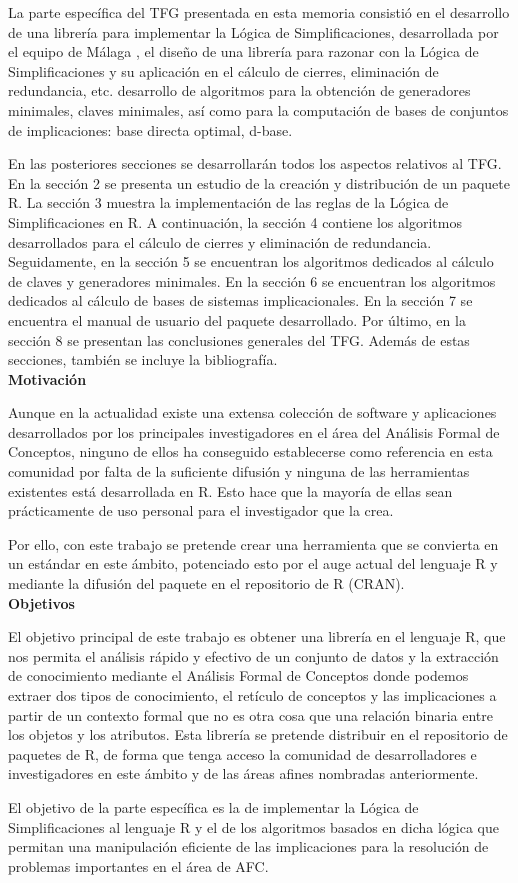 La parte espec\'ifica del TFG presentada en esta memoria consisti\'o en el desarrollo de una librer\'ia para implementar la L\'ogica de Simplificaciones, desarrollada por el equipo de M\'alaga \cite{Cordero2002}, el dise\~no de una librer\'ia para razonar con la L\'ogica de Simplificaciones y su aplicaci\'on en el c\'alculo de cierres, eliminaci\'on de redundancia, etc. desarrollo de algoritmos para la obtenci\'on de generadores minimales, claves minimales, as\'i como para la computaci\'on de bases de conjuntos de implicaciones: base directa optimal, d-base. 

En las posteriores secciones se desarrollar\'an todos los aspectos relativos al TFG. En la secci\'on 2 se presenta un estudio de la creaci\'on y distribuci\'on de un paquete R. La secci\'on 3 muestra la implementaci\'on de las reglas de la L\'ogica de Simplificaciones en R. A continuaci\'on, la secci\'on 4 contiene los algoritmos desarrollados para el c\'alculo de cierres y eliminaci\'on de redundancia. Seguidamente, en la secci\'on 5 se encuentran los algoritmos dedicados al c\'alculo de claves y generadores minimales. En la secci\'on 6 se encuentran los algoritmos dedicados al c\'alculo de bases de sistemas implicacionales. En la secci\'on 7 se encuentra el manual de usuario del paquete desarrollado. Por \'ultimo, en la secci\'on 8 se presentan las conclusiones generales del TFG. Adem\'as de estas secciones, tambi\'en se incluye la bibliograf\'ia.\\

\textbf{Motivaci\'on}

Aunque en la actualidad existe una extensa colecci\'on de software y aplicaciones desarrollados por los principales investigadores en el \'area del  An\'alisis Formal de Conceptos, ninguno de ellos ha conseguido establecerse como referencia en esta comunidad por falta de la suficiente difusi\'on y ninguna de las herramientas existentes est\'a desarrollada en R. Esto hace que la mayor\'ia de ellas sean pr\'acticamente de uso personal para el investigador que la crea. 

Por ello, con este trabajo se pretende crear una herramienta que se convierta en un est\'andar en este \'ambito, potenciado esto por el auge actual del lenguaje R y mediante la difusi\'on del paquete en el repositorio de R (CRAN).\\


\textbf{Objetivos}

El objetivo principal de este trabajo es obtener una librer\'ia en el lenguaje R, que nos permita el an\'alisis r\'apido y efectivo de un conjunto de datos y la extracci\'on de conocimiento mediante el An\'alisis Formal de Conceptos donde podemos extraer dos tipos de conocimiento, el ret\'iculo de conceptos y las implicaciones a partir de un contexto formal que no es otra cosa que una relaci\'on binaria entre los objetos y los atributos. Esta librer\'ia se pretende distribuir en el repositorio de paquetes de R, de forma que tenga acceso la comunidad de desarrolladores e investigadores en este \'ambito y de las \'areas afines nombradas anteriormente. 

El objetivo de la parte espec\'ifica es la de implementar la L\'ogica de Simplificaciones al lenguaje R y el de los algoritmos basados en dicha l\'ogica que permitan una manipulaci\'on eficiente de las implicaciones para la resoluci\'on de problemas importantes en el \'area de AFC.

\newpage